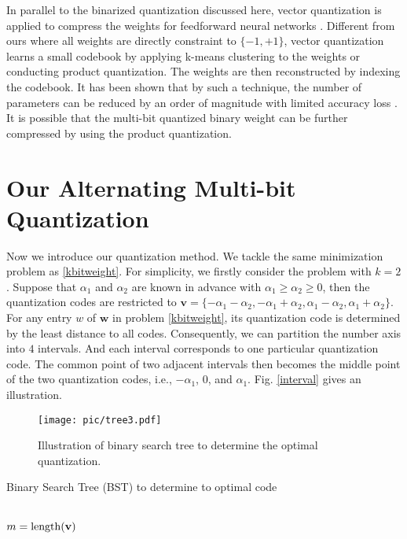 \documentclass{article} %
\newcommand{\w}{\mathbf{w}}
\newcommand{\<}{\left\langle}
\renewcommand{\>}{\right\rangle}
\let\oldnl\nl%
\newcommand\nonl{%
\renewcommand{\nl}{\let\nl\oldnl}}%
\begin{document}
In parallel to the binarized quantization discussed here, vector quantization is applied to compress the weights for feedforward neural networks \citep{vectorquantization,pruning}. Different from ours where all weights are directly constraint to $\{-1, +1\}$, vector quantization learns a small codebook by applying k-means clustering to the weights or conducting product quantization. The weights are then reconstructed by indexing the codebook. It has been shown that by such a technique, the number of parameters can be reduced by an order of magnitude with limited accuracy loss \citep{vectorquantization}. It is possible that the multi-bit quantized binary weight can be further compressed by using the product quantization.


\section{Our Alternating Multi-bit Quantization}


Now we  introduce our quantization method. We tackle the same minimization problem as \eqref{kbitweight}. For simplicity, we firstly consider the problem with $k = 2$.  Suppose that $\alpha_1$ and $\alpha_2$ are known in advance with $\alpha_1 \geq \alpha_2 \geq 0$, then the quantization codes are restricted to $\mathbf{v} = \{-\alpha_1 - \alpha_2, -\alpha_1 + \alpha_2, \alpha_1 - \alpha_2, \alpha_1 + \alpha_2\}$. For any entry $w$ of $\w$ in problem \eqref{kbitweight}, its quantization code is determined by the least distance to all codes. Consequently, we  can partition the number axis into $4$ intervals. And each interval corresponds to one particular quantization code. The common point of two adjacent intervals then becomes the middle point of the two quantization codes, i.e., $-\alpha_1$, $0$, and $\alpha_1$. Fig. \ref{interval} gives an illustration.  


\begin{figure}[t!]
	\centering
	\texttt{[image: pic/tree3.pdf]} \caption{Illustration of binary search tree to determine the optimal quantization.}
	\label{bstpic}   
\end{figure}


\begin{algorithm}[t!]
	\label{bstalg}
	\SetNoFillComment
	\caption{Binary Search Tree (BST) to determine to optimal code}
	\BlankLine 
	\nonl{}\\ 
	\Indp
	\BlankLine
	$m = {\rm length}(\mathbf{v})$ \\   
	{ %
		}
\end{algorithm}
\end{document}

